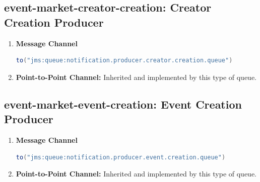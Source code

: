 \documentclass{article}
\begin{document}
\subsection{event-market-creator-creation: Creator Creation Producer}
\begin{enumerate}
    \item \textbf{Message Channel}
\begin{lstlisting}[language=Java, caption={Message Channel for Creator Creation}]
to("jms:queue:notification.producer.creator.creation.queue")
\end{lstlisting}
    \item \textbf{Point-to-Point Channel:} Inherited and implemented by this type of queue.
\end{enumerate}

\subsection{event-market-event-creation: Event Creation Producer}
\begin{enumerate}
    \item \textbf{Message Channel}
\begin{lstlisting}[language=Java, caption={Message Channel for Event Creation}]
to("jms:queue:notification.producer.event.creation.queue")
\end{lstlisting}
    \item \textbf{Point-to-Point Channel:} Inherited and implemented by this type of queue.
\end{enumerate}
\end{document}
